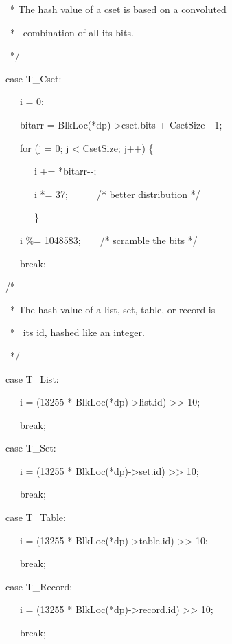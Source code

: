\ \ \ \ \ \ \ \ \ \ * The hash value of a cset is based on a convoluted 

\ \ \ \ \ \ \ \ \ \ * \ combination of all its bits.

\ \ \ \ \ \ \ \ \ \ */

\ \ \ \ \ \ \ \ \ case T\_Cset:

\ \ \ \ \ \ \ \ \ \ \ \ i = 0;

\ \ \ \ \ \ \ \ \ \ \ \ bitarr = BlkLoc(*dp)-{\textgreater}cset.bits + CsetSize - 1;

\ \ \ \ \ \ \ \ \ \ \ \ for (j = 0; j {\textless} CsetSize; j++) \{

\ \ \ \ \ \ \ \ \ \ \ \ \ \ \ i += *bitarr-{}-;

\ \ \ \ \ \ \ \ \ \ \ \ \ \ \ i *= 37;\ \ \ \ \ \ /* better distribution */

\ \ \ \ \ \ \ \ \ \ \ \ \ \ \ \}

\ \ \ \ \ \ \ \ \ \ \ \ i \%= 1048583;\ \ \ \ /* scramble the bits */

\ \ \ \ \ \ \ \ \ \ \ \ break;

\ \ \ \ \ \ \ \ \ /*

\ \ \ \ \ \ \ \ \ \ * The hash value of a list, set, table, or record is 

\ \ \ \ \ \ \ \ \ \ * \ its id, hashed like an integer.

\ \ \ \ \ \ \ \ \ \ */

\ \ \ \ \ \ \ \ \ case T\_List:

\ \ \ \ \ \ \ \ \ \ \ \ i = (13255 * BlkLoc(*dp)-{\textgreater}list.id) {\textgreater}{\textgreater} 10;

\ \ \ \ \ \ \ \ \ \ \ \ break;

\ \ \ \ \ \ \ \ \ case T\_Set:

\ \ \ \ \ \ \ \ \ \ \ \ i = (13255 * BlkLoc(*dp)-{\textgreater}set.id) {\textgreater}{\textgreater} 10;

\ \ \ \ \ \ \ \ \ \ \ \ break;

\ \ \ \ \ \ \ \ \ case T\_Table:

\ \ \ \ \ \ \ \ \ \ \ \ i = (13255 * BlkLoc(*dp)-{\textgreater}table.id) {\textgreater}{\textgreater} 10;

\ \ \ \ \ \ \ \ \ \ \ \ break;

\ \ \ \ \ \ \ \ \ case T\_Record:

\ \ \ \ \ \ \ \ \ \ \ \ i = (13255 * BlkLoc(*dp)-{\textgreater}record.id) {\textgreater}{\textgreater} 10;

\ \ \ \ \ \ \ \ \ \ \ \ break;

